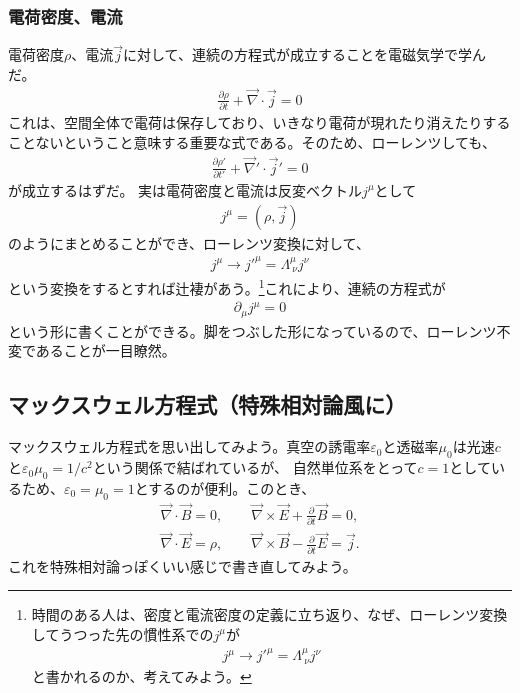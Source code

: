 \documentclass[10pt,a4paper]{jarticle}
\begin{document}
\subsubsection{電荷密度、電流}
電荷密度$\rho$、電流$\vec j$に対して、連続の方程式が成立することを電磁気学で学んだ。
\begin{align}
\frac{\partial \rho}{\partial t} + \vec\nabla \cdot \vec j = 0
\end{align}
これは、空間全体で電荷は保存しており、いきなり電荷が現れたり消えたりすることないということ意味する重要な式である。そのため、ローレンツしても、
\begin{align}
\frac{\partial \rho'}{\partial t'} + \vec\nabla' \cdot \vec j' = 0
\end{align}
が成立するはずだ。
実は電荷密度と電流は反変ベクトル$j^\mu$として
\begin{align}
j^\mu = (\rho, \vec j)
\end{align}
のようにまとめることができ、ローレンツ変換に対して、
\begin{align}
j^\mu \to j'^\mu = \Lambda^\mu_{~\nu} j^\nu
\end{align}
という変換をするとすれば辻褄があう。\footnote{
時間のある人は、密度と電流密度の定義に立ち返り、なぜ、ローレンツ変換してうつった先の慣性系での$j^\mu$が
\begin{align}
j^\mu \to j'^\mu = \Lambda^\mu_{~\nu} j^\nu
\end{align}
と書かれるのか、考えてみよう。}これにより、連続の方程式が
\begin{align}
\partial_\mu j^\mu = 0
\end{align}
という形に書くことができる。脚をつぶした形になっているので、ローレンツ不変であることが一目瞭然。


\subsection{マックスウェル方程式（特殊相対論風に）}
マックスウェル方程式を思い出してみよう。真空の誘電率$\varepsilon_0$と透磁率$\mu_0$は光速$c$と$\varepsilon_0 \mu_0 = 1/c^2$という関係で結ばれているが、
自然単位系をとって$c=1$としているため、$\varepsilon_0 = \mu_0 = 1$とするのが便利。このとき、
\begin{align}
\vec\nabla \cdot \vec B = 0, \qquad
\vec\nabla \times \vec E + \frac{\partial}{\partial t}\vec B = 0, \label{eq:bianchi}\\
\vec\nabla \cdot \vec E = \rho, \qquad
\vec\nabla \times \vec B - \frac{\partial}{\partial t} \vec E = \vec j. \label{eq:maxwell}
\end{align}
これを特殊相対論っぽくいい感じで書き直してみよう。
\end{document}
